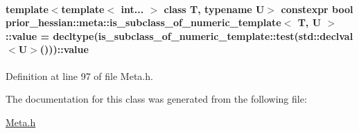 \paragraph[{\texorpdfstring{value}{value}}]{\setlength{\rightskip}{0pt plus 5cm}template$<$template$<$ int... $>$ class T, typename U$>$ constexpr bool {\bf prior\+\_\+hessian\+::meta\+::is\+\_\+subclass\+\_\+of\+\_\+numeric\+\_\+template}$<$ T, U $>$\+::value = decltype(is\+\_\+subclass\+\_\+of\+\_\+numeric\+\_\+template\+::test(std\+::declval$<$U$>$()))\+::value\hspace{0.3cm}{\ttfamily [static]}}\hypertarget{classprior__hessian_1_1meta_1_1is__subclass__of__numeric__template_a42ab6357020f653442004e834c93a6dd}{}\label{classprior__hessian_1_1meta_1_1is__subclass__of__numeric__template_a42ab6357020f653442004e834c93a6dd}


Definition at line 97 of file Meta.\+h.



The documentation for this class was generated from the following file\+:\begin{DoxyCompactItemize}
\item 
\hyperlink{Meta_8h}{Meta.\+h}\end{DoxyCompactItemize}
